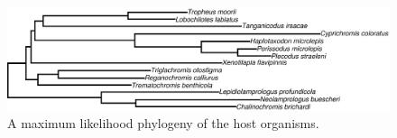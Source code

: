 \begin{figure}
    \includegraphics[width=\textwidth]{FishPoo/figures/mcgee_tree.pdf}
    \caption{A maximum likelihood phylogeny of the host organisms.}
    \label{FP_host_tree}
\end{figure}
